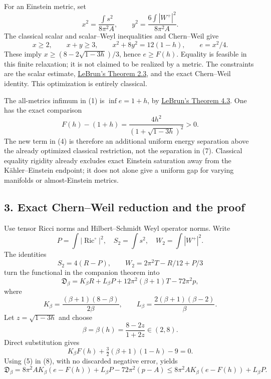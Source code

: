 \documentclass[
  10pt,
]{article}
\begin{document}
For an Einstein metric, set \[
 x^2=\frac{\int s^2}{8\pi^2A},\qquad
 y^2=\frac{6\int|W^+|^2}{8\pi^2A}.
\] The classical scalar and scalar--Weyl inequalities and Chern--Weil
give \[
 x\ge2,\qquad x+y\ge3,\qquad x^2+8y^2=12(1-h),\qquad e=x^2/4.
 \tag{6}
\] These imply \(x\ge(8-2\sqrt{1-3h})/3\), hence \(e\ge F(h)\). Equality
is feasible in this finite relaxation; it is not claimed to be realized
by a metric. The constraints are the scalar estimate,
\href{https://arxiv.org/pdf/math/0003068}{LeBrun's Theorem 2.3}, and the
exact Chern--Weil identity. This optimization is entirely classical.

The all-metrics infimum in (1) is \(\inf e=1+h\), by
\href{https://arxiv.org/pdf/math/0003068}{LeBrun's Theorem 4.3}. One has
the exact comparison \[
 F(h)-(1+h)=\frac{4h^2}{(1+\sqrt{1-3h})^2}>0.
 \tag{7}
\] The new term in (4) is therefore an additional uniform energy
separation above the already optimized classical restriction, not the
separation in (7). Classical equality rigidity already excludes exact
Einstein saturation away from the Kähler--Einstein endpoint; it does not
alone give a uniform gap for varying manifolds or almost-Einstein
metrics.

\hypertarget{exact-chernweil-reduction-and-the-proof}{%
\subsection{3. Exact Chern--Weil reduction and the
proof}\label{exact-chernweil-reduction-and-the-proof}}

Use tensor Ricci norms and Hilbert--Schmidt Weyl operator norms. Write
\[
 P=\int|\operatorname{Ric}^{\circ}|^2,\quad S_2=\int s^2,\quad
 W_2=\int|W^+|^2.
\] The identities \[
 S_2=4(R-P),\qquad W_2=2\pi^2T-R/12+P/3
\] turn the functional in the companion theorem into \[
 \mathfrak D_\beta
 =K_\beta R+L_\beta P+12\pi^2(\beta+1)T-72\pi^2p,
 \tag{8}
\] where \[
 K_\beta=\frac{(\beta+1)(8-\beta)}{2\beta},\qquad
 L_\beta=\frac{2(\beta+1)(\beta-2)}{\beta}.
\] Let \(z=\sqrt{1-3h}\) and choose \[
 \beta=\beta(h)=\frac{8-2z}{1+2z}\in(2,8).
 \tag{9}
\] Direct substitution gives \[
 K_\beta F(h)+\tfrac32(\beta+1)(1-h)-9=0.
\] Using (5) in (8), with no discarded negative error, yields \[
 \mathfrak D_\beta
 =8\pi^2A K_\beta(e-F(h))+L_\beta P-72\pi^2(p-A)
 \le8\pi^2A K_\beta(e-F(h))+L_\beta P.
 \tag{10}
\]
\end{document}
